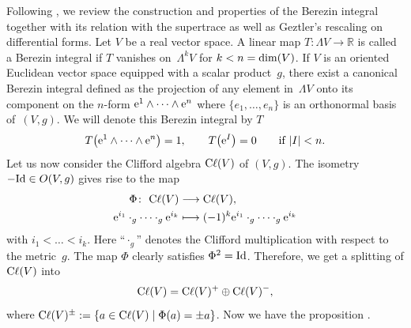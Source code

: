 \documentclass[pdftex]{sigma}
\numberwithin{equation}{section}
\theoremstyle{definition}
\newcommand{\Cl}{{\rm C}\ell}
\begin{document}
Following \cite[Section~3]{BGV}, we review the construction and properties of the Berezin integral together with its relation with the supertrace as well as Geztler's rescaling on differential forms. Let $V$ be a real vector space. A linear map $T\colon\Lambda V\to \mathbb{R}$ is called a Berezin integral if $T$ vanishes on~$\Lambda^kV$ for $k<n={\rm dim}(V)$. If $V$ is an oriented Euclidean vector space equipped with a scalar product~$g$, there exist a canonical Berezin integral defined as the projection of any element in~$\Lambda V$ onto its component on the $n$-form ${\rm e}^1\wedge \dots \wedge {\rm e}^n$ where $\{e_1,\dots,e_n\}$ is an orthonormal basis of~$(V,g)$. We will denote this Berezin integral by $T$
\[T\bigl({\rm e}^1\wedge \dots \wedge {\rm e}^n\bigr)=1,\qquad T\bigl({\rm e}^I\bigr)=0\qquad \text{if}\ |I|<n.\]
Let us now consider the Clifford algebra $\Cl(V)$ of $(V,g)$. The isometry $-{\rm Id}\in O(V,g)$ gives rise to the map
\begin{align*}
	\Phi\colon \ \Cl(V) &\longrightarrow \Cl(V),\nonumber\\ {\rm e}^{i_1}\cdot_g\cdots\cdot_g {\rm e}^{i_k}&\longmapsto (-1)^k{\rm e}^{i_1}\cdot_g\cdots\cdot_g {\rm e}^{i_k}
\end{align*}
with $i_1<\dots< i_k$. Here ``$\cdot_g$'' denotes the Clifford multiplication with respect to the metric~$g$. The map $\Phi$ clearly satisfies $\Phi^2={\rm Id}$. Therefore, we get a splitting of $\Cl(V)$ into
\[\Cl(V)=\Cl(V)^+\oplus \Cl(V)^-,\]
where $\Cl(V)^\pm:=\{a\in \Cl(V)\mid \Phi(a)=\pm a\}$. Now we have the proposition \cite[Proposition~3.19]{BGV}.
\end{document}
